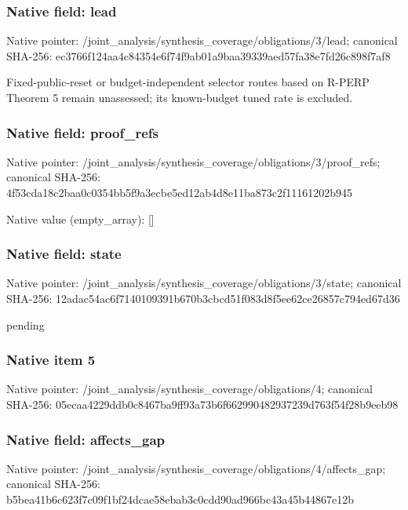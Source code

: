 \documentclass[10pt,a4paper]{article}
\begin{document}
\subsubsection{Native field: lead}
Native pointer: /joint\_\allowbreak{}analysis/synthesis\_\allowbreak{}coverage/obligations/3/lead; canonical SHA-256: ec3766f124aa4c84354e6f74f9ab01a9baa39339aed57fa38e7fd26c898f7af8

\begingroup\raggedright\sloppy Fixed-public-reset or budget-independent selector routes based on R-PERP Theorem 5 remain unassessed;\allowbreak{} its known-budget tuned rate is excluded.\par\endgroup

\subsubsection{Native field: proof\_\allowbreak{}refs}
Native pointer: /joint\_\allowbreak{}analysis/synthesis\_\allowbreak{}coverage/obligations/3/proof\_\allowbreak{}refs; canonical SHA-256: 4f53cda18c2baa0c0354bb5f9a3ecbe5ed12ab4d8e11ba873c2f11161202b945

Native value (empty\_\allowbreak{}array): []

\subsubsection{Native field: state}
Native pointer: /joint\_\allowbreak{}analysis/synthesis\_\allowbreak{}coverage/obligations/3/state; canonical SHA-256: 12adac54ac6f7140109391b670b3cbcd51f083d8f5ee62ce26857c794ed67d36

\begingroup\raggedright\sloppy pending\par\endgroup

\subsubsection{Native item 5}
Native pointer: /joint\_\allowbreak{}analysis/synthesis\_\allowbreak{}coverage/obligations/4; canonical SHA-256: 05ecaa4229ddb0c8467ba9ff93a73b6f662990482937239d763f54f28b9eeb98

\subsubsection{Native field: affects\_\allowbreak{}gap}
Native pointer: /joint\_\allowbreak{}analysis/synthesis\_\allowbreak{}coverage/obligations/4/affects\_\allowbreak{}gap; canonical SHA-256: b5bea41b6c623f7c09f1bf24dcae58ebab3c0cdd90ad966bc43a45b44867e12b
\end{document}

